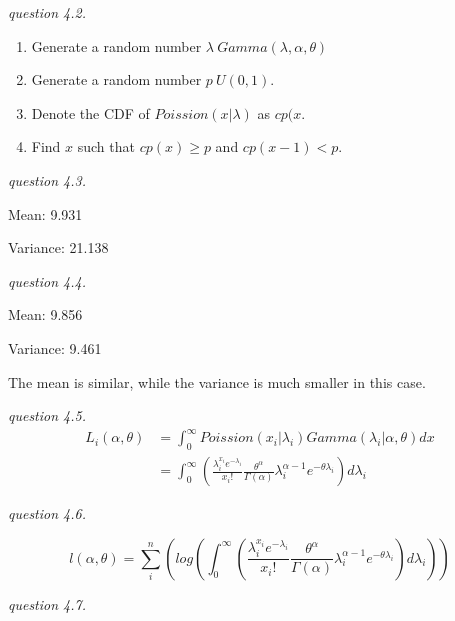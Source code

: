 \documentclass{article}
\begin{document}
\vspace{\baselineskip}
\textit{question 4.2.}

\begin{enumerate}
    \item Generate a random number $\lambda ~ Gamma(\lambda, \alpha, \theta)$
    \item Generate a random number $p ~ U(0, 1)$.
    \item Denote the CDF of $Poission(x|\lambda)$ as $cp(x$.
    \item Find $x$ such that $cp(x)\geq p$ and $cp(x-1)<p$.
\end{enumerate}

\vspace{\baselineskip}
\textit{question 4.3.}

Mean: 9.931

Variance: 21.138

\vspace{\baselineskip}
\textit{question 4.4.}

Mean: 9.856

Variance: 9.461

The mean is similar, while the variance is much smaller in this case.

\vspace{\baselineskip}
\textit{question 4.5.}
\begin{align*}
    L_i(\alpha, \theta)&=\int_0^\infty Poission(x_i|\lambda_i)Gamma(\lambda_i|\alpha, \theta)dx\\&=\int_0^\infty\left(\frac{\lambda_i^{x_i}e^{-\lambda_i}}{x_i!}\frac{\theta^\alpha}{\Gamma(\alpha)}\lambda_i^{\alpha-1}e^{-\theta\lambda_i}\right)d\lambda_i
\end{align*}

\vspace{\baselineskip}
\textit{question 4.6.}

$$l(\alpha, \theta)=\sum_i^n\left(log\left(\int_0^\infty\left(\frac{\lambda_i^{x_i}e^{-\lambda_i}}{x_i!}\frac{\theta^\alpha}{\Gamma(\alpha)}\lambda_i^{\alpha-1}e^{-\theta\lambda_i}\right)d\lambda_i\right)\right)$$

\vspace{\baselineskip}
\textit{question 4.7.}
\end{document}
